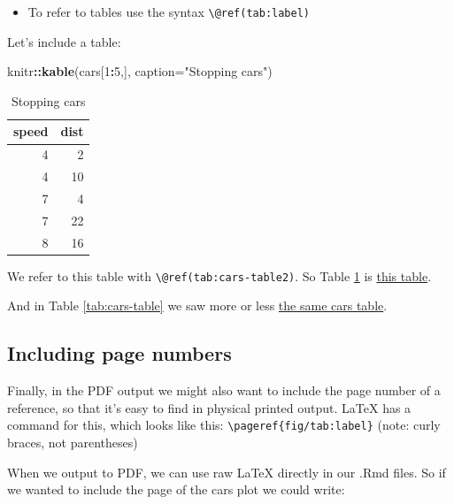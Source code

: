 \documentclass[a4paper, twoside]{templates/ociamthesis}
\providecommand{\tightlist}{%
  \setlength{\itemsep}{0pt}\setlength{\parskip}{0pt}}
\newenvironment{Shaded}{\begin{snugshade}}{\end{snugshade}}
\newcommand{\DataTypeTok}[1]{\textcolor[rgb]{0.13,0.29,0.53}{#1}}
\newcommand{\DecValTok}[1]{\textcolor[rgb]{0.00,0.00,0.81}{#1}}
\newcommand{\KeywordTok}[1]{\textcolor[rgb]{0.13,0.29,0.53}{\textbf{#1}}}
\newcommand{\NormalTok}[1]{#1}
\newcommand{\OperatorTok}[1]{\textcolor[rgb]{0.81,0.36,0.00}{\textbf{#1}}}
\newcommand{\StringTok}[1]{\textcolor[rgb]{0.31,0.60,0.02}{#1}}
\renewenvironment{Shaded}
{
  \vspace{10pt}%
  \begin{snugshade}%
}{%
  \end{snugshade}%
  \vspace{8pt}%
}
\theoremstyle{definition}
\theoremstyle{definition}
\theoremstyle{definition}
\theoremstyle{definition}
\theoremstyle{remark}
\begin{document}
\begin{itemize}
\tightlist
\item
  To refer to tables use the syntax \texttt{\textbackslash{}@ref(tab:label)}
\end{itemize}

Let's include a table:

\begin{Shaded}
\begin{Highlighting}[]
\NormalTok{knitr}\OperatorTok{::}\KeywordTok{kable}\NormalTok{(cars[}\DecValTok{1}\OperatorTok{:}\DecValTok{5}\NormalTok{,],}
            \DataTypeTok{caption=}\StringTok{"Stopping cars"}\NormalTok{)}
\end{Highlighting}
\end{Shaded}

\begin{table}

\caption{\label{tab:cars-table2}Stopping cars}
\centering
\begin{tabular}[t]{r|r}
\hline
speed & dist\\
\hline
4 & 2\\
\hline
4 & 10\\
\hline
7 & 4\\
\hline
7 & 22\\
\hline
8 & 16\\
\hline
\end{tabular}
\end{table}

We refer to this table with \texttt{\textbackslash{}@ref(tab:cars-table2)}.
So Table \ref{tab:cars-table2} is \protect\hyperlink{tab:cars-table2}{this table}.

And in Table \ref{tab:cars-table} we saw more or less \protect\hyperlink{tab:cars-table}{the same cars table}.

\hypertarget{including-page-numbers}{%
\subsection{Including page numbers}\label{including-page-numbers}}

Finally, in the PDF output we might also want to include the page number of a reference, so that it's easy to find in physical printed output.
LaTeX has a command for this, which looks like this: \texttt{\textbackslash{}pageref\{fig/tab:label\}} (note: curly braces, not parentheses)

When we output to PDF, we can use raw LaTeX directly in our .Rmd files. So if we wanted to include the page of the cars plot we could write:
\end{document}
